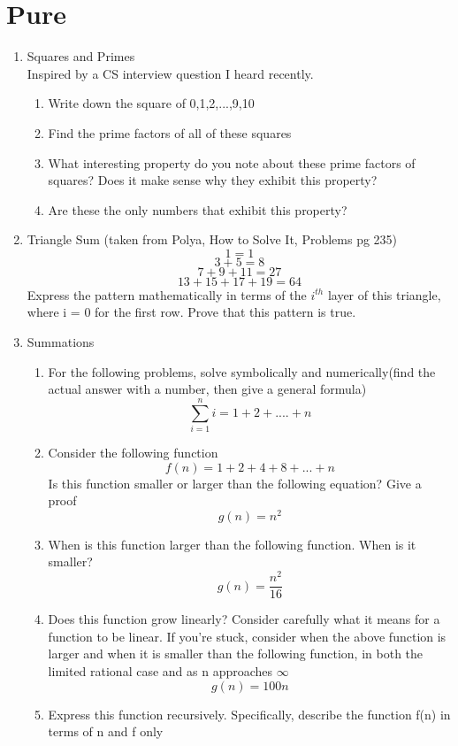 \documentclass{article}
\begin{document}
\section{Pure}
\begin{enumerate}

    \item Squares and Primes\\
    Inspired by a CS interview question I heard recently.
    \begin{enumerate}
        \item Write down the square of 0,1,2,...,9,10
        \item Find the prime factors of all of these squares
        \item What interesting property do you note about these prime factors of squares? Does it make sense why they exhibit this property?
        \item Are these the only numbers that exhibit this property?
    \end{enumerate}
    
    \item Triangle Sum (taken from Polya, How to Solve It, Problems pg 235)
        \[ 1 = 1  \]
        \[ 3 + 5 = 8 \]
        \[ 7 + 9 + 11 = 27  \]
        \[ 13 + 15 + 17 + 19 = 64  \]
        Express the pattern mathematically in terms of the $i^{th}$ layer of this triangle, where i = 0 for the first row. Prove that this pattern is true.

    \item Summations
    \begin{enumerate}
        \item For the following problems, solve symbolically and numerically(find the actual answer with a number, then give a general formula)\\
        \[ \sum\limits_{i=1}^n i =1 + 2 + .... + n \]
        \item Consider the following function\\
        \[f(n) = 1 + 2 + 4 + 8 + ... + n \]
        Is this function smaller or larger than the following equation? Give a proof \\
        \[g(n) = n^2 \]
        \item When is this function larger than the following function. When is it smaller?\\
        \[g(n) = \frac{n^2}{16} \]
        \item Does this function grow linearly? Consider carefully what it means for a function to be linear. If you're stuck, consider when the above function is larger and when it is smaller than the following function, in both the limited rational case and as n approaches $\infty$\\
        \[g(n) = 100n \]
        \item Express this function recursively. Specifically, describe the function f(n) in terms of n and f only
    \end{enumerate}
    
\end{enumerate}
\end{document}

